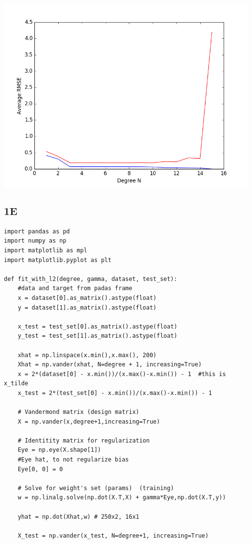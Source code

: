 \documentclass[12pt]{article}
\begin{document}
\begin{flushleft}
\begin{lstlisting}
\end{lstlisting}
		\includegraphics[scale=0.5]{HW1_1D.png}
		\label{fig:graph 1D}
		
		\subsection*{1E}
\begin{lstlisting}
import pandas as pd
import numpy as np
import matplotlib as mpl
import matplotlib.pyplot as plt

def fit_with_l2(degree, gamma, dataset, test_set):
	#data and target from padas frame
	x = dataset[0].as_matrix().astype(float)
	y = dataset[1].as_matrix().astype(float)
	
	x_test = test_set[0].as_matrix().astype(float)
	y_test = test_set[1].as_matrix().astype(float)
	
	xhat = np.linspace(x.min(),x.max(), 200)
	Xhat = np.vander(xhat, N=degree + 1, increasing=True)
	x = 2*(dataset[0] - x.min())/(x.max()-x.min()) - 1  #this is x_tilde
	x_test = 2*(test_set[0] - x.min())/(x.max()-x.min()) - 1
	
	# Vandermond matrix (design matrix)
	X = np.vander(x,degree+1,increasing=True)
	
	# Identitity matrix for regularization
	Eye = np.eye(X.shape[1])
	#Eye hat, to not regularize bias
	Eye[0, 0] = 0
	
	# Solve for weight's set (params)  (training)
	w = np.linalg.solve(np.dot(X.T,X) + gamma*Eye,np.dot(X.T,y))
	
	yhat = np.dot(Xhat,w) # 250x2, 16x1
	
	X_test = np.vander(x_test, N=degree+1, increasing=True)
	

\end{lstlisting}
\end{flushleft}
\end{document}
